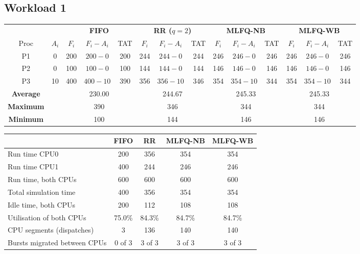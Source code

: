\documentclass[11pt,a4paper]{article}
\begin{document}
\subsection{Workload 1}
\begin{center}\footnotesize\setlength{\tabcolsep}{4pt}
\begin{tabular}{cccccccccccccc}\toprule
& & \multicolumn{3}{c}{\textbf{FIFO}} & \multicolumn{3}{c}{\textbf{RR ($q=2$)}} & \multicolumn{3}{c}{\textbf{MLFQ-NB}} & \multicolumn{3}{c}{\textbf{MLFQ-WB}} \\
\cmidrule(lr){3-5}\cmidrule(lr){6-8}\cmidrule(lr){9-11}\cmidrule(lr){12-14}
Proc & $A_i$ & $F_i$ & $F_i-A_i$ & TAT & $F_i$ & $F_i-A_i$ & TAT & $F_i$ & $F_i-A_i$ & TAT & $F_i$ & $F_i-A_i$ & TAT \\\midrule
P1 & 0 & 200 & $200-0$ & 200 & 244 & $244-0$ & 244 & 246 & $246-0$ & 246 & 246 & $246-0$ & 246 \\
P2 & 0 & 100 & $100-0$ & 100 & 144 & $144-0$ & 144 & 146 & $146-0$ & 146 & 146 & $146-0$ & 146 \\
P3 & 10 & 400 & $400-10$ & 390 & 356 & $356-10$ & 346 & 354 & $354-10$ & 344 & 354 & $354-10$ & 344 \\
\midrule
\textbf{Average} & & \multicolumn{3}{c}{230.00} & \multicolumn{3}{c}{244.67} & \multicolumn{3}{c}{245.33} & \multicolumn{3}{c}{245.33} \\
\textbf{Maximum} & & \multicolumn{3}{c}{390} & \multicolumn{3}{c}{346} & \multicolumn{3}{c}{344} & \multicolumn{3}{c}{344} \\
\textbf{Minimum} & & \multicolumn{3}{c}{100} & \multicolumn{3}{c}{144} & \multicolumn{3}{c}{146} & \multicolumn{3}{c}{146} \\
\bottomrule\end{tabular}\end{center}
\begin{center}\footnotesize\begin{tabular}{lcccc}\toprule
& \textbf{FIFO} & \textbf{RR} & \textbf{MLFQ-NB} & \textbf{MLFQ-WB}\\\midrule
Run time CPU0 & 200 & 356 & 354 & 354 \\
Run time CPU1 & 400 & 244 & 246 & 246 \\
Run time, both CPUs & 600 & 600 & 600 & 600 \\
Total simulation time & 400 & 356 & 354 & 354 \\
Idle time, both CPUs & 200 & 112 & 108 & 108 \\
Utilisation of both CPUs & 75.0\% & 84.3\% & 84.7\% & 84.7\% \\
CPU segments (dispatches) & 3 & 136 & 140 & 140 \\
Bursts migrated between CPUs & 0 of 3 & 3 of 3 & 3 of 3 & 3 of 3 \\
\bottomrule\end{tabular}\end{center}
\end{document}
